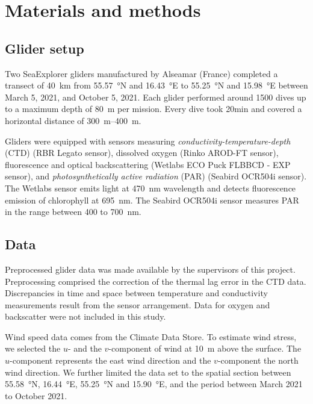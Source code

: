 \documentclass[../Main.tex]{subfiles}
\begin{document}
\section*{\crule[blue]{.3cm}{.3cm} Materials and methods}
\subsection*{\crule[blue]{.2cm}{.2cm} Glider setup}
Two SeaExplorer gliders manufactured by Alseamar (France) completed a transect of \SI{40}{km} from \SI{55.57}{\degree}N and \SI{16.43}{\degree}E to \SI{55.25}{\degree}N and \SI{15.98}{\degree}E between March 5, 2021, and October 5, 2021. 
Each glider performed around 1500 dives up to a maximum depth of \SI{80}{m} per mission. 
Every dive took 20min and covered a horizontal distance of \SIrange{300}{400}{m}. 
 
Gliders were equipped with sensors measuring \emph{conductivity-temperature-depth} (CTD) (RBR Legato sensor), dissolved oxygen (Rinko AROD-FT sensor), fluorescence and optical backscattering (Wetlabs ECO Puck FLBBCD - EXP sensor), and \emph{photosynthetically active radiation} (PAR) (Seabird OCR504i sensor). 
The Wetlabs sensor emits light at \SI{470}{nm} wavelength and detects fluorescence emission of chlorophyll at \SI{695}{nm}. 
The Seabird OCR504i sensor measures PAR in the range between 400 to \SI{700}{nm}.\supercite{ACSA2014}

\subsection*{\crule[blue]{.2cm}{.2cm} Data}
Preprocessed glider data was made available by the supervisors of this project. Preprocessing comprised the correction of the thermal lag error in the CTD data.
Discrepancies in time and space between temperature and conductivity measurements result from the sensor arrangement.\supercite{Garau2011}
Data for oxygen and backscatter were not included in this study.

Wind speed data comes from the Climate Data Store.\supercite{era} 
To estimate wind stress, we selected the $u$- and the $v$-component of wind at \SI{10}{m} above the surface. 
The $u$-component represents the east wind direction and the $v$-component the north wind direction.\supercite{era2} 
We further limited the data set to the spatial section between \SI{55.58}{\degree}N, \SI{16.44}{\degree}E, \SI{55.25}{\degree}N and \SI{15.90}{\degree}E, and the period between March 2021 to October 2021. 
\end{document}
